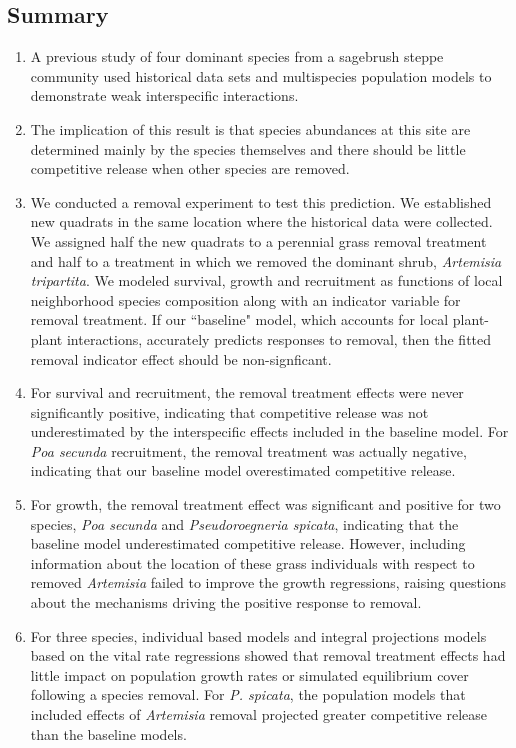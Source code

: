 \documentclass[11pt]{article}
\begin{document}
\begin{doublespacing} 

\linenumbers

\section*{Summary}

\begin{enumerate}
\item A previous study of four dominant species from a sagebrush steppe community used historical data sets and multispecies population models to demonstrate weak interspecific interactions. 
\item The implication of this result is that species abundances at this site are determined mainly by the species themselves and there should be little competitive release when other species are removed. 
\item We conducted a removal experiment to test this prediction. We established new quadrats in the same location where the historical data were collected. We assigned half the new quadrats to a  perennial grass removal treatment and half to a treatment in which we removed the dominant shrub, \textit{Artemisia tripartita}. We modeled survival, growth and recruitment as functions of local neighborhood species composition along with an indicator variable for removal treatment. If our ``baseline" model, which accounts for local plant-plant interactions, accurately predicts responses to removal, then the fitted removal indicator effect should be non-signficant.
\item  For survival and recruitment, the removal treatment effects were never significantly positive, indicating that competitive release was not underestimated by the interspecific effects included in the baseline model. For  \textit{Poa secunda} recruitment, the removal treatment was actually negative, indicating that our baseline model overestimated competitive release.
\item For growth, the removal treatment effect was significant and positive for two species, \textit{Poa secunda} and \textit{Pseudoroegneria spicata}, indicating that the baseline model underestimated competitive release. However, including information about the location of these grass individuals with respect to removed \textit{Artemisia} failed to improve the growth regressions, raising questions about the mechanisms driving the positive response to removal.
\item For three species, individual based models and integral projections models based on the vital rate regressions showed that removal treatment effects had little impact on population growth rates or simulated equilibrium cover following a species removal. For \textit{P. spicata}, the population models that included effects of \textit{Artemisia} removal projected greater competitive release than the baseline models. 

\end{enumerate}
\end{doublespacing}
\end{document}
